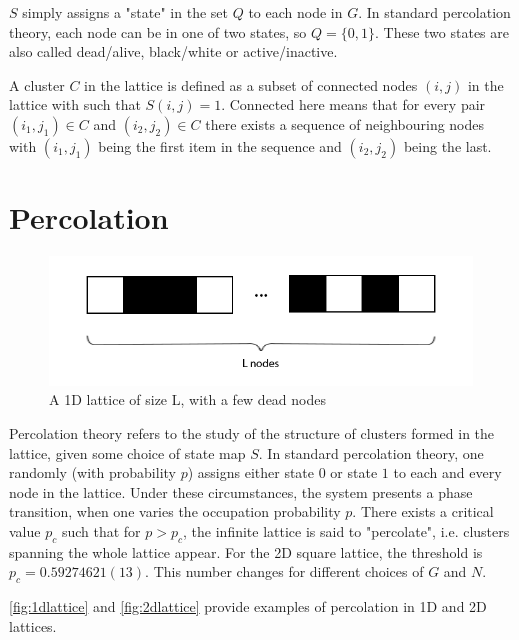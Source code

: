 $S$ simply assigns a "state" in the set $Q$ to each node in $G$. In standard percolation theory, each node can be in one of two states, so $Q = \{0, 1\}$. These two states are also called dead/alive, black/white or active/inactive.

A cluster $C$ in the lattice is defined as a subset of connected nodes $(i, j)$ in the lattice with such that $S(i, j) = 1$. Connected here means that for every pair $(i_1, j_1) \in C$ and $(i_2, j_2) \in C$ there exists a sequence of neighbouring nodes with $(i_1, j_1)$ being the first item in the sequence and $(i_2, j_2)$ being the last.



\section{Percolation}

\begin{figure}[h]
  \includegraphics[width=\linewidth]{Images/1dlattice.png}
  \caption{A 1D lattice of size L, with a few dead nodes}
  \label{fig:1dlattice}
\end{figure}




Percolation theory refers to the study of the structure of clusters formed in the lattice, given some choice of state map $S$. In standard percolation theory, one randomly (with probability $p$) assigns either state $0$ or state $1$ to each and every node in the lattice. Under these circumstances, the system presents a phase transition, when one varies the occupation probability $p$. There exists a critical value $p_c$ such that for $p > p_c$, the infinite lattice is said to "percolate", i.e. clusters spanning the whole lattice appear. For the 2D square lattice, the threshold is $p_c = 0.59274621(13)$. This number changes for different choices of $G$ and $N$.


\autoref{fig:1dlattice} and \autoref{fig:2dlattice} provide examples of percolation in 1D and 2D lattices.


